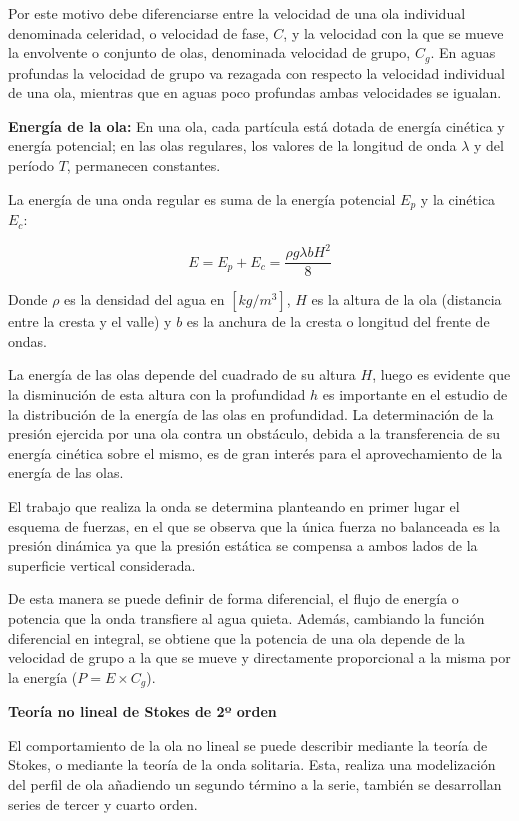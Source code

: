 Por este motivo debe diferenciarse entre la velocidad de una ola
individual denominada celeridad, o velocidad de fase, \(C\), y la
velocidad con la que se mueve la envolvente o conjunto de olas,
denominada velocidad de grupo, \(C_ g\). En aguas profundas la velocidad
de grupo va rezagada con respecto la velocidad individual de una ola,
mientras que en aguas poco profundas ambas velocidades se igualan.

\textbf{Energía de la ola:} En una ola, cada partícula está dotada de
energía cinética y energía potencial; en las olas regulares, los valores
de la longitud de onda \(\lambda\) y del período $T$, permanecen
constantes.

La energía de una onda regular es suma de la energía potencial $E_p$
y la cinética $E_c$:

\[E=E_p+E_c= \frac {\rho g \lambda b H^2}{8}\]

Donde \(\rho\) es la densidad del agua en \([kg/m^3]\), $H$ es la
altura de la ola (distancia entre la cresta y el valle) y $b$ es la
anchura de la cresta o longitud del frente de ondas.

La energía de las olas depende del cuadrado de su altura $H$, luego
es evidente que la disminución de esta altura con la profundidad
$h$ es importante en el estudio de la distribución de la energía de
las olas en profundidad. La determinación de la presión ejercida por una
ola contra un obstáculo, debida a la transferencia de su energía
cinética sobre el mismo, es de gran interés para el aprovechamiento de
la energía de las olas.

El trabajo que realiza la onda se determina planteando en primer lugar
el esquema de fuerzas, en el que se observa que la única fuerza no
balanceada es la presión dinámica ya que la presión estática se compensa
a ambos lados de la superficie vertical considerada.

De esta manera se puede definir de forma diferencial, el flujo de
energía o potencia que la onda transfiere al agua quieta. Además,
cambiando la función diferencial en integral, se obtiene que la potencia
de una ola depende de la velocidad de grupo a la que se mueve y
directamente proporcional a la misma por la energía
(\(P=E \times C_g\)).

\textbf{Teoría no lineal de Stokes de 2º
orden}

El comportamiento de la ola no lineal se puede describir mediante la
teoría de Stokes, o mediante la teoría de la onda solitaria. Esta,
realiza una modelización del perfil de ola añadiendo un segundo término
a la serie, también se desarrollan series de tercer y cuarto orden.

